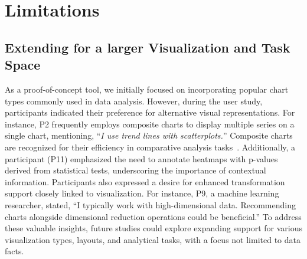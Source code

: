 \section{Limitations}
\subsection{Extending for a larger Visualization and Task Space}
As a proof-of-concept tool, we initially focused on incorporating popular chart types commonly used in data analysis. However, during the user study, participants indicated their preference for alternative visual representations.
For instance, P2 frequently employs composite charts to display multiple series on a single chart, mentioning, ``\textit{I use trend lines with scatterplots.}'' 
Composite charts are recognized for their efficiency in comparative analysis tasks~\cite{compare}.
Additionally, a participant (P11) emphasized the need to annotate heatmaps with p-values derived from statistical tests, underscoring the importance of contextual information.
Participants also expressed a desire for enhanced transformation support closely linked to visualization. For instance, P9, a machine learning researcher, stated, ``I typically work with high-dimensional data. Recommending charts alongside dimensional reduction operations could be beneficial.''
To address these valuable insights, future studies could explore expanding support for various visualization types, layouts, and analytical tasks, with a focus not limited to data facts.

